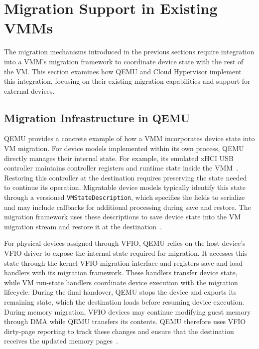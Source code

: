 \section{Migration Support in Existing VMMs}
\label{sec:state:vmm-migration}

The migration mechanisms introduced in the previous sections require 
integration into a VMM's migration framework to coordinate device state 
with the rest of the VM. This section examines how QEMU and Cloud 
Hypervisor implement this integration, focusing on their existing 
migration capabilities and support for external devices.

\subsection{Migration Infrastructure in QEMU}
\label{sec:state:qemu-migration}

QEMU provides a concrete example of how a VMM incorporates device state
into VM migration. For device models implemented within its own process,
QEMU directly manages their internal state. For example, its emulated
xHCI USB controller maintains controller registers and runtime state
inside the VMM~\cite{qemu-xhci-migration}. Restoring this controller at
the destination requires preserving the state needed to continue its
operation. Migratable device models typically identify this state
through a versioned \texttt{VMStateDescription}, which specifies the
fields to serialize and may include callbacks for additional processing
during save and restore. The migration framework uses these descriptions
to save device state into the VM migration stream and restore it at the
destination~\cite{qemu-migration-framework}.

For physical devices assigned through VFIO, QEMU relies on the host
device's VFIO driver to expose the internal state required for migration.
It accesses this state through the kernel VFIO migration interface and
registers save and load handlers with its migration framework. These
handlers transfer device state, while VM run-state handlers coordinate
device execution with the migration lifecycle. During the final handover,
QEMU stops the device and exports its remaining state, which the
destination loads before resuming device execution. During memory migration, 
VFIO devices may continue modifying guest memory through DMA while QEMU 
transfers its contents. QEMU therefore uses VFIO dirty-page reporting to 
track these changes and ensure that the destination receives the updated 
memory pages~\cite{qemu-vfio-migration}.

